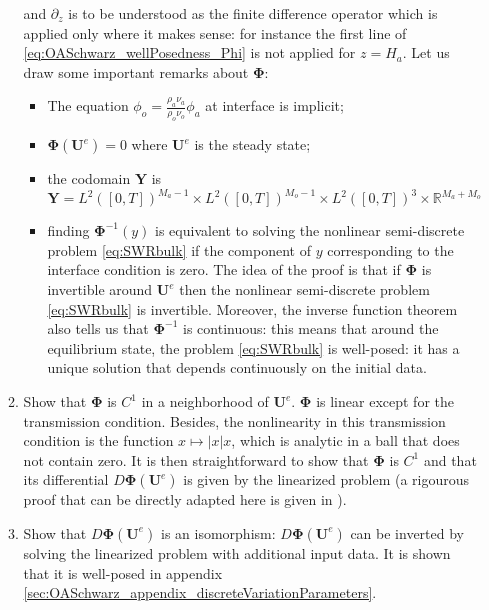 \begin{enumerate}
\begin{enumerate}
and $\partial_z$ is to be understood as the finite difference
operator which is applied only where it makes sense:
for instance the first line of \eqref{eq:OASchwarz_wellPosedness_Phi}
is not applied for $z=H_a$.
Let us draw some important remarks about $\mathbf{\Phi}$:
\begin{itemize}
 \item The equation $\phi_o = \frac{\rho_a \nu_a}{\rho_o \nu_o}\phi_a$
	 at interface is implicit;
 \item $\mathbf{\Phi}(\mathbf{U}^e)=0$
 	where $\mathbf{U}^e$
 	is the steady state;
 \item the codomain $\mathbf{Y}$ is
 	\begin{equation}
		\mathbf{Y}=L^2([0,T])^{M_a-1}
			\times L^2([0,T])^{M_o-1}
 			\times L^2([0,T])^{3}
			\times \mathbb{R}^{M_a+M_o}
 	\end{equation}
\item 
finding $\mathbf{\Phi}^{-1}(y)$ is equivalent
to solving the nonlinear semi-discrete problem
\eqref{eq:SWRbulk} if the component of $y$ corresponding
to the interface condition is zero.
The idea of the proof is that if $\mathbf{\Phi}$ is invertible
around $\mathbf{U}^e$ then the nonlinear semi-discrete problem
\eqref{eq:SWRbulk} is invertible.
Moreover, the inverse function theorem also tells us that
$\mathbf{\Phi}^{-1}$ is continuous:
this means that around
the equilibrium state, the problem \eqref{eq:SWRbulk} is well-posed:
it has a unique solution that depends continuously
on the initial data.
\end{itemize}
	\item Show that $\mathbf{\Phi}$ is $C^1$ in a
		neighborhood of $\mathbf{U}^e$.
		$\mathbf{\Phi}$ is linear except for the
		transmission condition. Besides,
		the nonlinearity in this transmission condition
		is the function $x \mapsto |x|x$, which is analytic
		in a ball that does not contain zero.
		It is then straightforward to show that
		$\mathbf{\Phi}$ is $C^1$ and that
		its differential
		$D\mathbf{\Phi}(\mathbf{U}^e)$ is given
		by the linearized problem (a rigourous
		proof that can be directly adapted here
		is given in \cite{chacon-rebollo_existence_2014}).
		\item Show that $D\mathbf{\Phi}(\mathbf{U}^e)$
		is an isomorphism:
		$D\mathbf{\Phi}(\mathbf{U}^e)$ can
		be inverted by solving the linearized problem
		with additional input data.
		It is shown
		that it is well-posed in appendix
		\ref{sec:OASchwarz_appendix_discreteVariationParameters}.
	\end{enumerate}
\end{enumerate}
